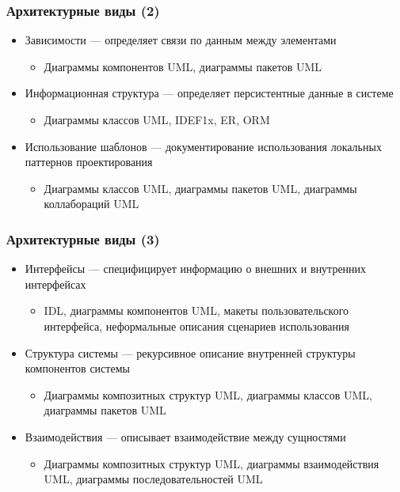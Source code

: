 \documentclass[xetex,mathserif,serif]{beamer}
\begin{document}
    \begin{frame}
        \frametitle{Архитектурные виды (2)}
        \begin{itemize}
            \item Зависимости --- определяет связи по данным между элементами
            \begin{itemize}
                \item Диаграммы компонентов UML, диаграммы пакетов UML
            \end{itemize}
            \item Информационная структура --- определяет персистентные данные в системе
            \begin{itemize}
                \item Диаграммы классов UML, IDEF1x, ER, ORM
            \end{itemize}
            \item Использование шаблонов --- документирование использования локальных паттернов проектирования
            \begin{itemize}
                \item Диаграммы классов UML, диаграммы пакетов UML, диаграммы коллабораций UML
            \end{itemize}
        \end{itemize}
    \end{frame}

    \begin{frame}
        \frametitle{Архитектурные виды (3)}
        \begin{itemize}
            \item Интерфейсы --- специфицирует информацию о внешних и внутренних интерфейсах
            \begin{itemize}
                \item IDL, диаграммы компонентов UML, макеты пользовательского интерфейса, неформальные описания сценариев использования
            \end{itemize}
            \item Структура системы --- рекурсивное описание внутренней структуры компонентов системы
            \begin{itemize}
                \item Диаграммы композитных структур UML, диаграммы классов UML, диаграммы пакетов UML
            \end{itemize}
            \item Взаимодействия --- описывает взаимодействие между сущностями
            \begin{itemize}
                \item Диаграммы композитных структур UML, диаграммы взаимодействия UML, диаграммы последовательностей UML
            \end{itemize}
        \end{itemize}
    \end{frame}
\end{document}
